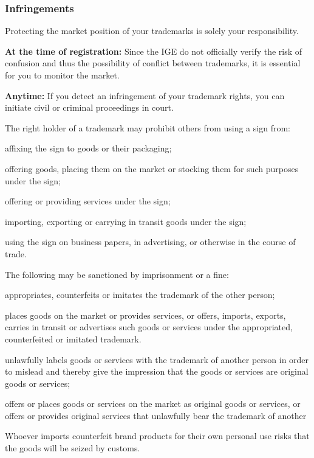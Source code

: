 \subsubsection{Infringements}
Protecting the market position of your trademarks is solely your responsibility.
\begin{compactitem}
	\item \textbf{At the time of registration:} Since the IGE do not officially verify the risk of confusion and thus the possibility	of conflict between trademarks, it is essential for you to monitor the market.
	\item \textbf{Anytime:} If you detect an infringement of your trademark rights, you can initiate civil or criminal proceedings in court.
\end{compactitem}
The right holder of a trademark may prohibit others from using a sign from:
\begin{compactitem}
	\item affixing the sign to goods or their packaging;
	\item offering goods, placing them on the market or stocking them for such	purposes under the sign;
	\item offering or providing services under the sign;
	\item importing, exporting or carrying in transit goods under the sign;
	\item using the sign on business papers, in advertising, or otherwise in the course	of trade.
\end{compactitem}
The following may be sanctioned by imprisonment or a fine:
\begin{compactitem}
	\item appropriates, counterfeits or imitates the trademark of the other person;
	\item places goods on the market or provides services, or offers, imports, exports, carries in transit or advertises such goods or services under the appropriated, counterfeited or imitated trademark.
	\item unlawfully labels goods or services with the trademark of another person in order to mislead and thereby give the impression that the goods or services are original goods or services;
	\item offers or places goods or services on the market as original goods or services, or offers or provides original services that unlawfully bear the trademark of another
\end{compactitem}
Whoever imports counterfeit brand products for their own personal use risks that the goods will be seized by customs.

